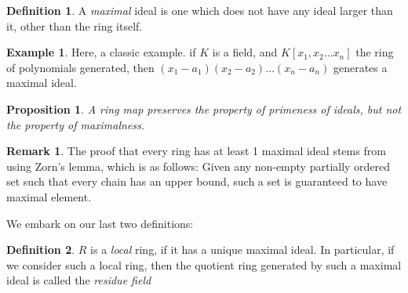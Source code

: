 \documentclass[12pt]{book}
\newtheorem{proposition}{Proposition}[section]
\theoremstyle{definition}
\newtheorem*{definition}{Definition}
\newtheorem{example}{Example}[chapter]
\newtheorem*{remark}{Remark}
\begin{document}
\begin{definition}
    A \textit{maximal} ideal is one which does not have any ideal larger than it, other than the ring itself. 
\end{definition}
\begin{example}
    Here, a classic example. if $K$ is a field, and $K[x_1, x_2 \ldots x_n]$ the ring of polynomials generated, then $(x_1 - a_1)(x_2 - a_2)\ldots(x_n - a_n)$ generates a maximal ideal.
\end{example}
\begin{proposition}
    A ring map preserves the property of primeness of ideals, but not the property of maximalness.
\end{proposition}
\begin{remark}
    The proof that every ring has at least 1 maximal ideal stems from using Zorn's lemma, which is as follows: Given any non-empty partially ordered set such that every chain has an upper bound, such a set is guaranteed to have maximal element.
\end{remark}
We embark on our last two definitions:
\begin{definition}
    $R$ is a \textit{local} ring, if it has a unique maximal ideal. In particular, if we consider such a local ring, then the quotient ring generated by such a maximal ideal is called the \textit{residue field}
\end{definition}
\end{document}
